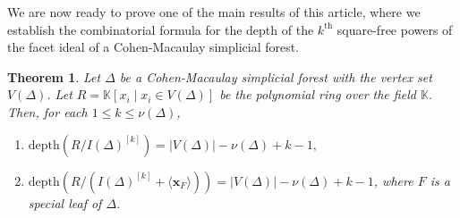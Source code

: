 \documentclass[12pt,a4paper,reqno]{amsart}
\newtheorem{theorem}[proposition]{Theorem}
\theoremstyle{definition}
\def\K{\mathbb{K}}
\def\D{\Delta}
\def\d{\mathrm{depth}}
\def\l{\langle}
\def\r{\rangle}
\def\x{\mathbf x}
\begin{document}
We are now ready to prove one of the main results of this article, where we establish the combinatorial formula for the depth of the $k^{\text{th}}$ square-free powers of the facet ideal of a Cohen-Macaulay simplicial forest.

\begin{theorem}\label{main theorem 1}
    Let $\Delta$ be a Cohen-Macaulay simplicial forest with the vertex set $V(\Delta)$. Let $R=\K[x_i\mid x_i\in V(\Delta)]$ be the polynomial ring over the field $\K$. Then, for each $1\le k\le\nu(\Delta)$, 
    \begin{enumerate}
        \item[(i)] $\d(R/I(\Delta)^{[k]})=|V(\Delta)|-\nu(\D)+k-1,$
        \item[(ii)] $\d(R/(I(\Delta)^{[k]}+\l\x_{F}\r))= |V(\Delta)|-\nu(\D)+k-1$, where $F$ is a special leaf of $\Delta$.
    \end{enumerate}
    
    
\end{theorem}
\end{document}
